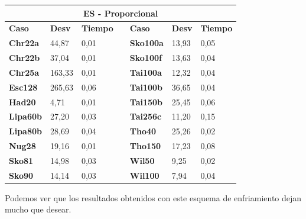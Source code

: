 \documentclass[a4paper, 12pt]{article}
\begin{document}
      \begin{table}[H]
\centering
\begin{tabular}{|l|l|l|l|l|l|l|}
\hline
\multicolumn{7}{|c|}{\textbf{ES - Proporcional}}                                                                    \\ \hline
\textbf{Caso}    & \textbf{Desv} & \textbf{Tiempo} & \textbf{} & \textbf{Caso}    & \textbf{Desv} & \textbf{Tiempo} \\ \cline{1-3} \cline{5-7} 
\textbf{Chr22a}  & 44,87         & 0,01            &           & \textbf{Sko100a} & 13,93         & 0,05            \\ \cline{1-3} \cline{5-7} 
\textbf{Chr22b}  & 37,04         & 0,01            &           & \textbf{Sko100f} & 13,63         & 0,04            \\ \cline{1-3} \cline{5-7} 
\textbf{Chr25a}  & 163,33        & 0,01            &           & \textbf{Tai100a} & 12,32         & 0,04            \\ \cline{1-3} \cline{5-7} 
\textbf{Esc128}  & 265,63        & 0,06            &           & \textbf{Tai100b} & 36,65         & 0,04            \\ \cline{1-3} \cline{5-7} 
\textbf{Had20}   & 4,71          & 0,01            &           & \textbf{Tai150b} & 25,45         & 0,06            \\ \cline{1-3} \cline{5-7} 
\textbf{Lipa60b} & 27,20         & 0,03            &           & \textbf{Tai256c} & 11,20         & 0,15            \\ \cline{1-3} \cline{5-7} 
\textbf{Lipa80b} & 28,69         & 0,04            &           & \textbf{Tho40}   & 25,26         & 0,02            \\ \cline{1-3} \cline{5-7} 
\textbf{Nug28}   & 19,16         & 0,01            &           & \textbf{Tho150}  & 17,23         & 0,08            \\ \cline{1-3} \cline{5-7} 
\textbf{Sko81}   & 14,98         & 0,03            &           & \textbf{Wil50}   & 9,25          & 0,02            \\ \cline{1-3} \cline{5-7} 
\textbf{Sko90}   & 14,14         & 0,03            &           & \textbf{Wil100}  & 7,94          & 0,04            \\ \cline{1-3} \cline{5-7} 
\end{tabular}
\end{table}

	Podemos ver que los resultados obtenidos con este esquema de enfriamiento dejan mucho que desear.
\end{document}
